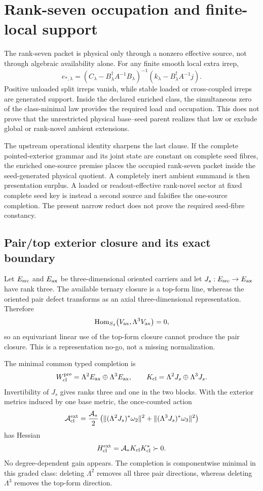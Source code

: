 \documentclass[11pt]{article}
\begin{document}
\section{Rank-seven occupation and finite-local support}

The rank-seven packet is physical only through a nonzero effective source,
not through algebraic availability alone. For any finite smooth local extra
irrep,
\[
 e_{*,\lambda}=
 (C_\lambda-B_\lambda^\dagger A^{-1}B_\lambda)^{-1}
 (k_\lambda-B_\lambda^\dagger A^{-1}j).
\]
Positive unloaded split irreps vanish, while stable loaded or cross-coupled
irreps are generated support. Inside the declared enriched class, the
simultaneous zero of the class-minimal law provides the required load and
occupation. This does not prove that the unrestricted physical base--seed
parent realizes that law or exclude global or rank-novel ambient extensions.

The upstream operational identity sharpens the last clause. If the complete
pointed-exterior grammar and its joint state are constant on complete seed
fibres, the enriched one-source premise places the occupied rank-seven packet
inside the seed-generated physical quotient. A completely inert ambient
summand is then presentation surplus. A loaded or readout-effective rank-novel
sector at fixed complete seed key is instead a second source and falsifies the
one-source completion. The present narrow reduct does not prove the required
seed-fibre constancy.

\subsection{Pair/top exterior closure and its exact boundary}

Let $E_{\rm src}$ and $E_{\rm ax}$ be three-dimensional oriented carriers and
let $J_s:E_{\rm src}\to E_{\rm ax}$ have rank three.  The available ternary
closure is a top-form line, whereas the oriented pair defect transforms as an
axial three-dimensional representation.  Therefore
\[
 \operatorname{Hom}_{S_4}
 \bigl(V_{\rm ax},\Lambda^3V_{\rm ax}\bigr)=0,
\]
so an equivariant linear use of the top-form closure cannot produce the pair
closure.  This is a representation no-go, not a missing normalization.

The minimal common typed completion is
\[
 W_{\rm cl}^{\rm pre}
 =\Lambda^2E_{\rm ax}\oplus\Lambda^3E_{\rm ax},
 \qquad
 K_{\rm cl}=\Lambda^2J_s\oplus\Lambda^3J_s.
\]
Invertibility of $J_s$ gives ranks three and one in the two blocks.  With the
exterior metrics induced by one base metric, the once-counted action
\[
 \mathcal A_{\rm cl}^{\rm ext}
 =\frac{\mathcal A_*}{2}
 \left(
 \| (\Lambda^2J_s)^*\omega_2\|^2
 +\| (\Lambda^3J_s)^*\omega_3\|^2
 \right)
\]
has Hessian
\[
 H_{\rm cl}^{\rm ext}=\mathcal A_*K_{\rm cl}K_{\rm cl}^*\succ0.
\]
No degree-dependent gain appears.  The completion is componentwise minimal
in this graded class: deleting $\Lambda^2$ removes all three pair directions,
whereas deleting $\Lambda^3$ removes the top-form direction.
\end{document}
